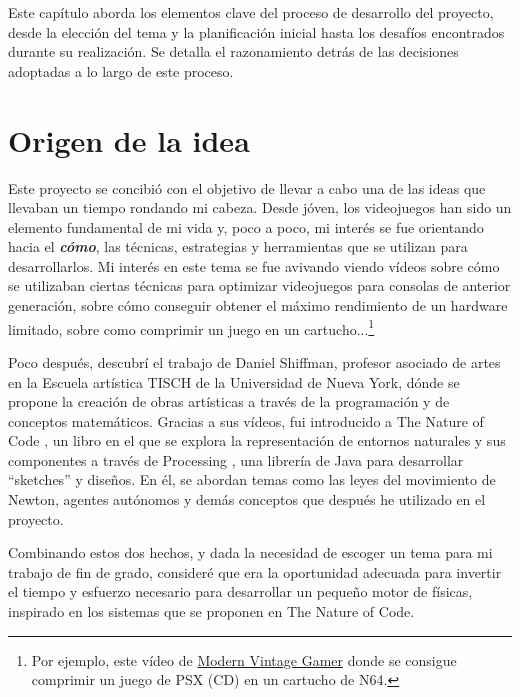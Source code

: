 
Este capítulo aborda los elementos clave del proceso de desarrollo del proyecto, desde la elección del tema y la planificación inicial hasta los desafíos encontrados durante su realización. Se detalla el razonamiento detrás de las decisiones adoptadas a lo largo de este proceso.

\section{Origen de la idea}
Este proyecto se concibió con el objetivo de llevar a cabo una de las ideas que llevaban un tiempo rondando mi cabeza. Desde jóven, los videojuegos han sido un elemento fundamental de mi vida y, poco a poco, mi interés se fue orientando hacia el \textbf{\textit{cómo}}, las técnicas, estrategias y herramientas que se utilizan para desarrollarlos. Mi interés en este tema se fue avivando viendo vídeos sobre cómo se utilizaban ciertas técnicas para optimizar videojuegos para consolas de anterior generación, sobre cómo conseguir obtener el máximo rendimiento de un hardware limitado, sobre como comprimir un juego en un cartucho...\footnote{Por ejemplo, este vídeo de \href{https://www.youtube.com/watch?v=BaX5YUZ5FLk}{Modern Vintage Gamer} donde se consigue comprimir un juego de PSX (CD) en un cartucho de N64.}

Poco después, descubrí el trabajo de Daniel Shiffman, profesor asociado de artes en la Escuela artística TISCH de la Universidad de Nueva York, dónde se propone la creación de obras artísticas a través de la programación y de conceptos matemáticos. Gracias a sus vídeos, fui introducido a The Nature of Code \cite{shiffman12}, un libro en el que se explora la representación de entornos naturales y sus componentes a través de Processing \cite{processing}, una librería de Java para desarrollar ``sketches'' y diseños. En él, se abordan temas como las leyes del movimiento de Newton, agentes autónomos y demás conceptos que después he utilizado en el proyecto. 

Combinando estos dos hechos, y dada la necesidad de escoger un tema para mi trabajo de fin de grado, consideré que era la oportunidad adecuada para invertir el tiempo y esfuerzo necesario para desarrollar un pequeño motor de físicas, inspirado en los sistemas que se proponen en The Nature of Code.


